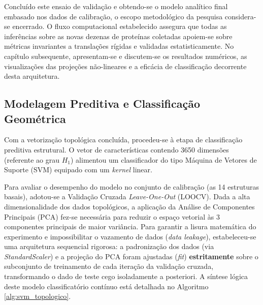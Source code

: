 \documentclass[12pt, a4paper]{article}
\theoremstyle{plain}
\theoremstyle{definition}
\theoremstyle{remark}
\newcommand{\ident}{\hspace{2em}}
\begin{document}
\ident Concluído este ensaio de validação e obtendo-se o modelo analítico final embasado nos dados de calibração, o escopo metodológico da pesquisa considera-se encerrado. O fluxo computacional estabelecido assegura que todas as inferências sobre as novas dezenas de proteínas coletadas apoiem-se sobre métricas invariantes a translações rígidas e validadas estatisticamente. No capítulo subsequente, apresentam-se e discutem-se os resultados numéricos, as visualizações das projeções não-lineares e a eficácia de classificação decorrente desta arquitetura.

\subsection{Modelagem Preditiva e Classificação Geométrica}

\ident Com a vetorização topológica concluída, procedeu-se à etapa de classificação preditiva estrutural. O vetor de características contendo 3650 dimensões (referente ao grau $H_1$) alimentou um classificador do tipo Máquina de Vetores de Suporte (SVM) equipado com um \textit{kernel} linear.

\ident Para avaliar o desempenho do modelo no conjunto de calibração (as 14 estruturas basais), adotou-se a Validação Cruzada \textit{Leave-One-Out} (LOOCV). Dada a alta dimensionalidade dos dados topológicos, a aplicação da Análise de Componentes Principais (PCA) fez-se necessária para reduzir o espaço vetorial às 3 componentes principais de maior variância. Para garantir a lisura matemática do experimento e impossibilitar o vazamento de dados (\textit{data leakage}), estabeleceu-se uma arquitetura sequencial rigorosa: a padronização dos dados (via \textit{StandardScaler}) e a projeção do PCA foram ajustadas (\textit{fit}) \textbf{estritamente} sobre o subconjunto de treinamento de cada iteração da validação cruzada, transformando o dado de teste cego isoladamente a posteriori. A síntese lógica deste modelo classificatório contínuo está detalhada no Algoritmo \ref{alg:svm_topologico}.
\end{document}
